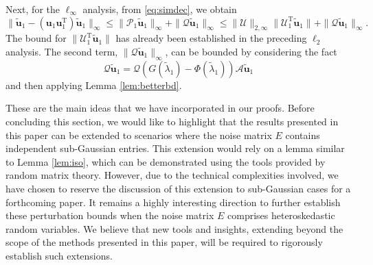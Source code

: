 \documentclass[reqno]{amsart}
\newcommand{\T}{\mathrm{T}}
\theoremstyle{plain}
\theoremstyle{definition}
\begin{document}
Next, for the $\ell_\infty$ analysis, from \eqref{eq:simdec}, we obtain
$$\| \widetilde{\mathbf u}_1 - ({\mathbf u}_1 {\mathbf u}_1^\T )\widetilde{\mathbf u}_1\|_{\infty} \le \|\mathcal P_1 \widetilde{\mathbf u}_1\|_{\infty} + \|\mathcal Q \widetilde{\mathbf u}_1\|_{\infty}\le \|\mathcal U\|_{2,\infty} \|\mathcal U_1^\T \widetilde{\mathbf u}_1\| + \|\mathcal Q \widetilde{\mathbf u}_1\|_{\infty}.$$
The bound for $\|\mathcal U_1^\T \widetilde{\mathbf u}_1\|$ has already been established in the preceding $\ell_2$ analysis. The second term, $\|\mathcal Q \widetilde{\mathbf u}_1\|_{\infty}$, can be bounded by considering the fact
$$\mathcal Q \widetilde{\mathbf u}_1 = \mathcal Q \left(G(\widetilde \lambda_1)-\Phi(\widetilde \lambda_1) \right)\mathcal A \widetilde{\mathbf u}_1$$ and then applying Lemma \ref{lem:betterbd}. 

These are the main ideas that we have incorporated in our proofs. Before concluding this section, we would like to highlight that the results presented in this paper can be extended to scenarios where the noise matrix $E$ contains independent sub-Gaussian entries. This extension would rely on a lemma similar to Lemma \ref{lem:iso}, which can be demonstrated using the tools provided by random matrix theory. However, due to the technical complexities involved, we have chosen to reserve the discussion of this extension to sub-Gaussian cases for a forthcoming paper. 
It remains a highly interesting direction to further establish these perturbation bounds when the noise matrix $E$ comprises heteroskedastic random variables. We believe that new tools and insights, extending beyond the scope of the methods presented in this paper, will be required to rigorously establish such extensions.



\end{document}
